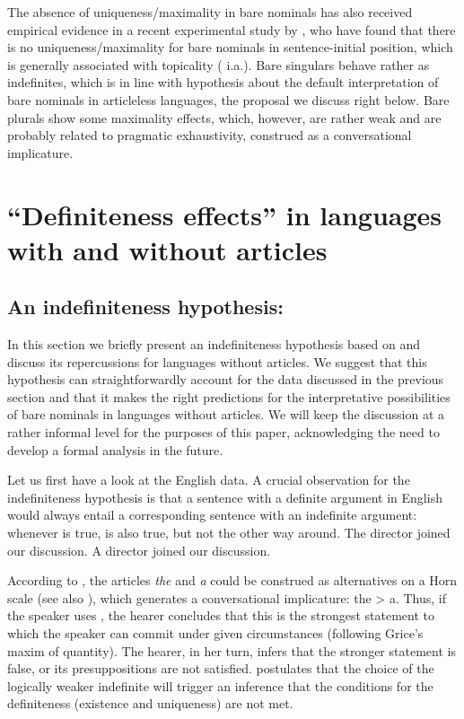 \documentclass[output=paper]{langscibook}
\begin{document}
\noindent The absence of uniqueness/maximality in  bare nominals has also received empirical evidence in a recent experimental study by \citet{Simik.Demian2020}, who have found that there is no uniqueness/maximality for bare nominals in sentence-initial position, which is generally associated with topicality (\citealt{Geist2010} i.a.). Bare singulars behave rather as indefinites, which is in line with  hypothesis about the default interpretation of bare nominals in articleless languages, the proposal we discuss right below. Bare plurals show some maximality effects, which, however, are rather weak and are probably related to pragmatic exhaustivity, construed as a conversational implicature.

\section{``Definiteness effects'' in languages with and without articles}
\label{sec:definiteness-effects}
\subsection{An indefiniteness hypothesis: \citet{Heim2011}}
In this section we briefly present an indefiniteness hypothesis based on \citet{Heim2011} and discuss its repercussions for languages without articles. We suggest that this hypothesis can straightforwardly account for the data discussed in the previous section and that it makes the right predictions for the interpretative possibilities of bare nominals in languages without articles. We will keep the discussion at a rather informal level for the purposes of this paper, acknowledging the need to develop a formal analysis in the future.

Let us
first have a look at the English data.
A crucial observation for the indefiniteness hypothesis is that a sentence with a definite argument in English would always entail a corresponding sentence with an indefinite argument: whenever  is true,  is also true, but not the other way around.
\ea
\ea \label{ex:seres:27a}
The director joined our discussion.
\ex \label{ex:seres:27b}
A director joined our discussion.
\z \z

\noindent According to \citet{Heim2011}, the articles \textit{the} and \textit{a} could be construed as alternatives on a Horn scale (see also \citealt{Hawkins1978}), %
which generates a conversational implicature: the > a. Thus, if the speaker uses , the hearer concludes that this is the strongest statement to which the speaker can commit under given circumstances (following Grice's maxim of quantity). The hearer, in her turn, infers that the stronger statement is false, or its presuppositions are not satisfied. \citet{Heim2011} postulates that the choice of the logically weaker indefinite will trigger an inference that the conditions for the definiteness (existence and uniqueness) are not met.
\end{document}
